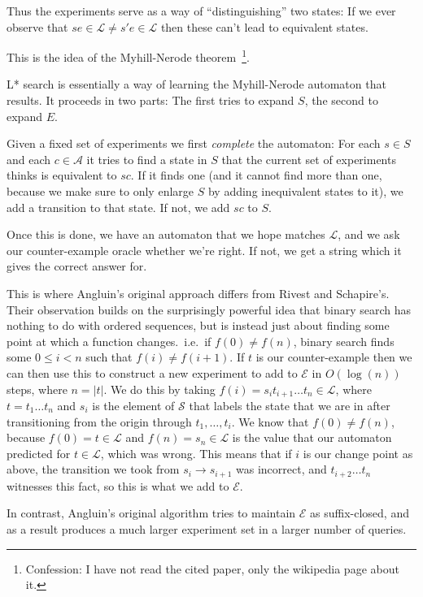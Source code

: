 Thus the experiments serve as a way of ``distinguishing'' two states:
If we ever observe that \(se \in \mathcal{L} \neq s'e \in \mathcal{L}\) then these can't lead to equivalent states.

This is the idea of the Myhill-Nerode theorem~\cite{nerode1958linear}\footnote{Confession:
I have not read the cited paper,
only the wikipedia page about it.
}.

L* search is essentially a way of learning the Myhill-Nerode automaton that results.
It proceeds in two parts:
The first tries to expand \(S\),
the second to expand \(E\).

Given a fixed set of experiments we first \emph{complete} the automaton:
For each \(s \in S\) and each \(c \in \mathcal{A}\) it tries to find a state in \(S\) that the current set of experiments thinks is equivalent to \(sc\).
If it finds one (and it cannot find more than one,
because we make sure to only enlarge \(S\) by adding inequivalent states to it),
we add a transition to that state.
If not,
we add \(sc\) to \(S\).

Once this is done,
we have an automaton that we hope matches \(\mathcal{L}\),
and we ask our counter-example oracle whether we're right.
If not,
we get a string which it gives the correct answer for.

This is where Angluin's original approach differs from Rivest and Schapire's.
Their observation builds on the surprisingly powerful idea that binary search has nothing to do with ordered sequences,
but is instead just about finding some point at which a function changes.\ 
i.e.\ if \(f(0) \neq f(n)\),
binary search finds some \(0 \leq i < n\) such that \(f(i) \neq f(i + 1)\).
If \(t\) is our counter-example then we can then use this to construct a new experiment to add to \(\mathcal{E}\) in \(O(\log(n))\) steps,
where \(n = |t|\).
We do this by taking \(f(i) = s_i t_{i+1} \ldots t_{n} \in \mathcal{L}\),
where \(t = t_1 \ldots t_n\) and \(s_i\) is the element of \(\mathcal{S}\) that labels the state that we are in after transitioning from the origin through
\(t_1, \ldots, t_i\).
We know that \(f(0) \neq f(n)\),
because \(f(0) = t \in \mathcal{L}\) and \(f(n) = s_n \in \mathcal{L}\) is the value that our automaton predicted for \(t \in \mathcal{L}\),
which was wrong.
This means that if \(i\) is our change point as above,
the transition we took from \(s_i \to s_{i + 1}\) was incorrect,
and \(t_{i + 2} \ldots t_n\) witnesses this fact,
so this is what we add to \(\mathcal{E}\).

In contrast,
Angluin's original algorithm tries to maintain \(\mathcal{E}\) as suffix-closed,
and as a result produces a much larger experiment set in a larger number of queries.

